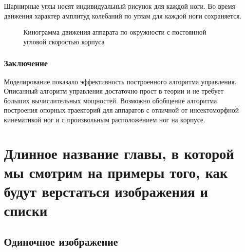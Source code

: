 Шарнирные углы носят индивидуальный рисунок для каждой ноги. Во время движения характер амплитуд колебаний по углам для каждой ноги сохраняется.


\newpage
\begin{figure}[t]
\caption{Кинограмма движения аппарата по окружности с постоянной угловой скоростью корпуса}
\end{figure}



%








\subsection{Заключение}
Моделирование показало эффективность построенного алгоритма управления. Описанный алгоритм управления достаточно прост в теории и не требует больших вычислительных мощностей. Возможно обобщение алгоритма построения опорных траекторий для аппаратов с отличной от инсектоморфной кинематикой ног и с произвольным расположением ног на корпусе.




\chapter{Длинное название главы, в которой мы смотрим на примеры того, как будут верстаться изображения и списки} \label{chapt2}

\section{Одиночное изображение} \label{sect2_1}

